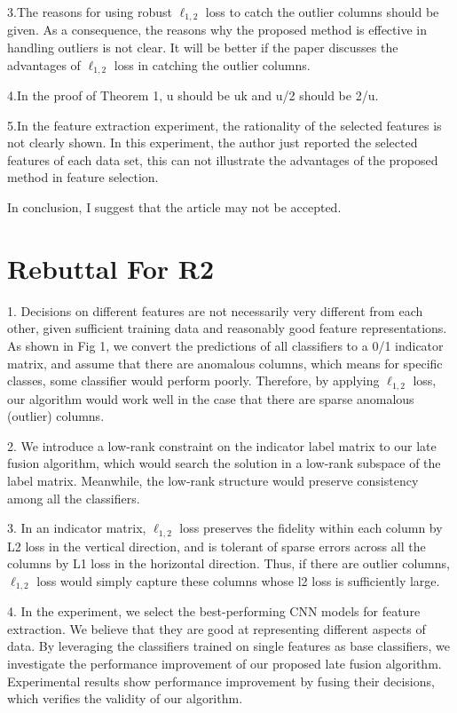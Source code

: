 \documentclass[letterpaper]{article}
\begin{document}
3.The reasons for using robust $\ell_{1, 2}$ loss to catch the outlier columns should be given. As a consequence, the reasons why the proposed method is effective in handling outliers is not clear. It will be better if the paper discusses the advantages of $\ell_{1, 2}$ loss in catching the outlier columns.

4.In the proof of Theorem 1, u should be uk and u/2 should be 2/u.

5.In the feature extraction experiment, the rationality of the selected features is not clearly shown. In this experiment, the author just reported the selected features of each data set, this can not illustrate the advantages of the proposed method in feature selection.

In conclusion, I suggest that the article may not be accepted.

\section{Rebuttal For R2}

1. Decisions on different features are not necessarily very different from each other, given sufficient training data and reasonably good feature representations.
As shown in Fig 1, we convert the predictions of all classifiers to a 0/1 indicator matrix,
and assume that there are anomalous columns,
which means for specific classes, some classifier would perform poorly.
Therefore, by applying $\ell_{1, 2}$ loss, our algorithm would work well in the case that there are sparse anomalous (outlier) columns.

2. We introduce a low-rank constraint on the indicator label matrix to our late fusion algorithm,
which would search the solution in a low-rank subspace of the label matrix.
Meanwhile, the low-rank structure would preserve consistency among all the classifiers.

3. In an indicator matrix, $\ell_{1, 2}$ loss preserves the fidelity within each column by L2 loss in the vertical direction,
and is tolerant of sparse errors across all the columns by L1 loss in the horizontal direction.
Thus, if there are outlier columns, $\ell_{1, 2}$ loss would simply capture these columns whose l2 loss is sufficiently large.

4. In the experiment, we select the best-performing CNN models for feature extraction.
We believe that they are good at representing different aspects of data.
By leveraging the classifiers trained on single features as base classifiers,
we investigate the performance improvement of our proposed late fusion algorithm.
Experimental results show performance improvement by fusing their decisions, which verifies the validity of our algorithm.
\end{document}
